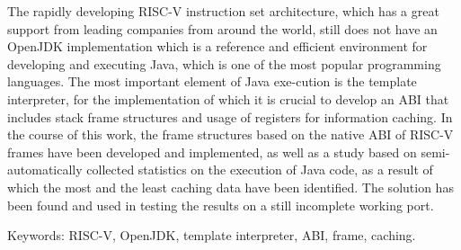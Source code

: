 \documentclass[14pt]{spbau-diploma}
\begin{document}
The rapidly developing RISC-V instruction set architecture, which has a great support from leading companies from around the world, still does not have an OpenJDK implementation which is a reference and efficient environment for developing and executing Java, which is one of the most popular  programming languages. The most important element of Java exe-\newline cution is the template interpreter, for the implementation of which it is crucial to develop an ABI that includes stack frame structures and usage of registers for information caching. In the course of this work, the frame structures based on the native ABI of RISC-V frames have been developed and implemented, as well as a study based on semi-automatically collected statistics on the execution of Java code, as a result of which the most and the least caching data have been identified. The solution has been found and used in testing the results on a still incomplete working port.

\vspace*{1em}

Keywords: RISC-V, OpenJDK, template interpreter, ABI, frame, caching.
















\glsaddall
\printnoidxglossary[title=Глоссарий, toctitle=Глоссарий, style=altlist,nonumberlist]



\end{document}
